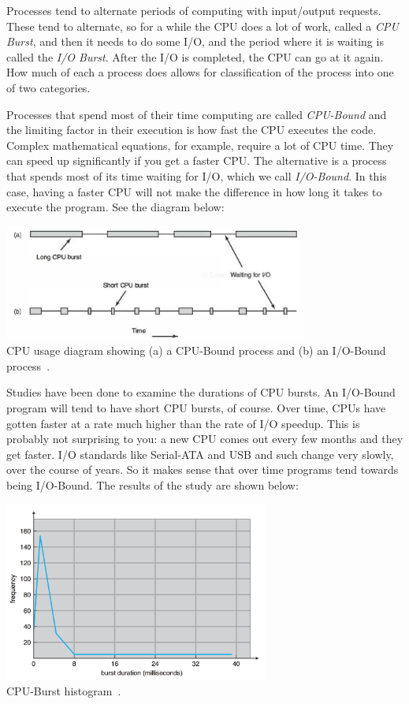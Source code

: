 Processes tend to alternate periods of computing with input/output requests. These tend to alternate, so for a while the CPU does a lot of work, called a \textit{CPU Burst}, and then it needs to do some I/O, and the period where it is waiting is called the \textit{I/O Burst}. After the I/O is completed, the CPU can go at it again. How much of each a process does allows for classification of the process into one of two categories.

Processes that spend most of their time computing are called \textit{CPU-Bound} and the limiting factor in their execution is how fast the CPU executes the code. Complex mathematical equations, for example, require a lot of CPU time. They can speed up significantly if you get a faster CPU. The alternative is a process that spends most of its time waiting for I/O, which we call \textit{I/O-Bound}. In this case, having a faster CPU will not make the difference in how long it takes to execute the program. See the diagram below:

\begin{center}
\includegraphics[width=0.75\textwidth]{images/cpu-io-bound.png}\\
CPU usage diagram showing (a) a CPU-Bound process and (b) an I/O-Bound process~\cite{mos}.
\end{center}

Studies have been done to examine the durations of CPU bursts. An I/O-Bound program will tend to have short CPU bursts, of course. Over time, CPUs have gotten faster at a rate much higher than the rate of I/O speedup. This is probably not surprising to you: a new CPU comes out every few months and they get faster. I/O standards like Serial-ATA and USB and such change very slowly, over the course of years. So it makes sense that over time programs tend towards being I/O-Bound. The results of the study are shown below:

\begin{center}
\includegraphics[width=0.65\textwidth]{images/cpu-burst-histogram.png}\\
CPU-Burst histogram~\cite{osc}.
\end{center}


